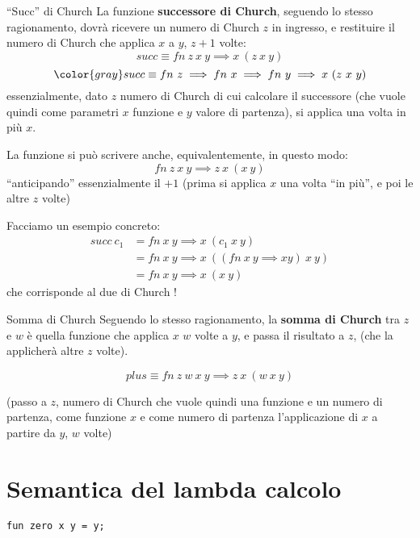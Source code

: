 \documentclass[a4paper,11pt]{report}
\begin{document}
\begin{defbox}{``Succ'' di Church}{}
    La funzione \textbf{successore di Church}, seguendo lo stesso ragionamento, dovrà ricevere un numero di Church \( z \) in ingresso, e restituire il numero di Church che applica \( x \) a \( y \), \( z+1 \) volte:
    \[ succ \equiv fn \ z \ x \ y \implies x\ (z \ x \ y) \]
    \[\color{gray} succ \equiv fn \ z \implies fn \ x \implies fn \ y \implies x\ (z \ x \ y) \]
    essenzialmente, dato \( z \) numero di Church di cui calcolare il successore (che vuole quindi come parametri \( x \) funzione e \( y \) valore di partenza), si applica una volta in più \( x \).

    La funzione si può scrivere anche, equivalentemente, in questo modo:
    \[ fn \ z \ x \ y \implies z \ x \ (x \ y) \]
    ``anticipando'' essenzialmente il \( +1 \) (prima si applica \( x \) una volta ``in più'', e poi le altre \( z \) volte)
\end{defbox}

Facciamo un esempio concreto:
\begin{align*}
    succ \ c_1 &= fn \ x \ y \implies x \ (c_1 \ x \ y) \\
               & = fn \ x \ y \implies x \ (( fn \ x \ y \implies xy) \ x \ y ) \\
               & = fn \ x \ y \implies x \ ( x \ y)
\end{align*}
che corrisponde al due di Church !

\begin{defbox}{Somma di Church}{}
    Seguendo lo stesso ragionamento, la \textbf{somma di Church} tra \( z\) e \( w \) è quella funzione che applica \( x\) \( w\) volte a \( y \), e passa il risultato a \( z \), (che la applicherà altre \( z \) volte).

    \[ plus \equiv fn \ z \ w \ x \ y \implies z \ x \ (w \ x \ y)\]

    (passo a \( z \), numero di Church che vuole quindi una funzione e un numero di partenza, come funzione \( x \) e come numero di partenza l'applicazione di \( x \) a partire da \( y \), \( w \) volte)

\end{defbox}
\section{Semantica del lambda calcolo}

\begin{lstlisting}
fun zero x y = y;
\end{lstlisting}
\end{document}
